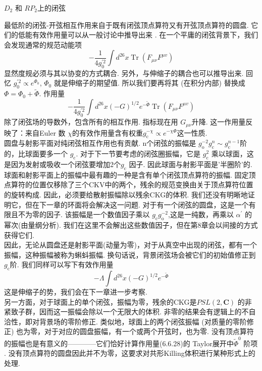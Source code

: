 \centerline{\Large $D_{2}$ 和 $R P_{2}$上的闭弦}
最低阶的闭弦-开弦相互作用来自于既有闭弦顶点算符又有开弦顶点算符的圆盘. 它们的低能有效作用量可以从一般讨论中推导出来 . 在一个平庸的闭弦背景下，我们会发现通常的规范动能项
\begin{equation}
	-\frac{1}{4 g_{0}^{\prime 2}} \int d^{26} x \operatorname{Tr}\left(F_{\mu \nu} F^{\mu v}\right)
\end{equation}
显然度规必须与其以协变的方式耦合. 另外，与伸缩子的耦合也可以推导出来. 回忆 $g_{0}^{\prime 2} \propto e^{\Phi_{0}}$,  $\Phi_{0}$ 就是伸缩子的期望值. 所以我们要再将其 (在积分内部) 替换成 $\Phi=\Phi_{0}+\tilde{\Phi}$. 作用量
\begin{equation}
	-\frac{1}{4 g_{0}^{\prime 2}} \int d^{26} x(-G)^{1 / 2} e^{-\tilde{\Phi}} \operatorname{Tr}\left(F_{\mu \nu} F^{\mu v}\right)
\end{equation}
除了闭弦场的导数外，包含所有的相互作用. 指标现在用 $G_{\mu \nu} $升降. 这一作用量反映了：来自Euler 数 $\chi$的有效作用量含有权重$g_{\mathrm{c}}^{-\chi} \propto e^{-\chi \Phi}$这一性质.\\
圆盘与射影平面对纯闭弦相互作用也有贡献. n个闭弦的振幅是 $g_{\mathrm{o}}^{-2} g_{\mathrm{c}}^{n} \sim g_{\mathrm{c}}^{n-1}$阶的，比球面要多一个 $g_{\mathrm{c}}$. 对于下一节要考虑的闭弦圈振幅，它是 $g_{\mathrm{c}}^{2}$ 乘以球面，这是因为发射或吸收一个闭弦要增加2个$g_{\mathrm{c}} $ 因子. 因此球面与射影平面是'半圈阶'的.\\
球面和射影平面上的振幅中最有趣的一种是含有单个闭弦顶点算符的振幅. 固定顶点算符的位置仅移除了三个CKV中的两个，残余的规范变换由关于顶点算符位置的旋转构成. 因此，必须要给散射振幅除以残余CKG的体积. 我们还没有明晰地证明它，但在下一章的环面将会解决这一问题. 对于有一个闭弦的圆盘，这是一个有限且不为零的因子. 该振幅是一个数值因子乘以 $g_{\mathrm{c}} g_{\mathrm{o}}^{-2}$,这是一纯数，再乘以 $\alpha^{\prime}$ 的幂次(由量纲分析). 我们在这里不会解出这些数值因子，但在第8章会以间接的方式获得它们. \\
因此，无论从圆盘还是射影平面(动量为零)，对于从真空中出现的闭弦，都有一个振幅，这种振幅被称为蝌蚪振幅. 换句话说，背景闭弦场会被它们的初始值修正到$g_{\mathrm{c}}$阶. 我们同样可以写下有效作用量
\begin{equation}
	-\Lambda \int d^{26} x(-G)^{1 / 2} e^{-\tilde{\Phi}}
\end{equation}
这是伸缩子的势，我们会在下一章进一步考察.\\
另一方面，对于球面上的单个闭弦，振幅为零，残余的CKG是$P S L(2, \mathbf{C})$ 的非紧致子群，因而这一振幅会除以一个无限大的体积. 非零的结果会有逻辑上的不自洽性，即对背景场的零阶修正. 类似地，球面上的两个闭弦振幅 (对质量的零阶修正) 也为零，对于对应的圆盘振幅，有一个或两个开弦时，也为零. 没有顶点算符的振幅也是有意义的————它们恰好计算作用量(6.6.28)的 Taylor展开中$\tilde{\Phi}^{0}$ 阶项 . 没有顶点算符的圆盘因此并不为零，这要求对共形Killing体积进行某种形式上的处理.

